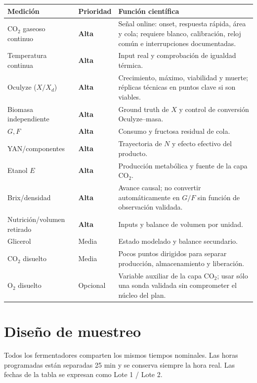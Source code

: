 \documentclass[11pt,a4paper]{article}
\newcommand{\alta}{\textbf{Alta}}
\newcommand{\media}{Media}
\newcommand{\opcional}{Opcional}
\begin{document}
\begin{longtable}{@{}p{}p{}p{}@{}}
\toprule
Medición & Prioridad & Función científica\\
\midrule
\endhead
CO$_2$ gaseoso continuo & \alta & Señal online: onset, respuesta rápida, área y
cola; requiere blanco, calibración, reloj común e interrupciones documentadas.\\
Temperatura continua & \alta & Input real y comprobación de igualdad térmica.\\
Oculyze (\(X/X_d\)) & \alta & Crecimiento, máximo, viabilidad y muerte; réplicas
técnicas en puntos clave si son viables.\\
Biomasa independiente & \alta & Ground truth de \(X\) y control de conversión
Oculyze--masa.\\
\(G,F\) & \alta & Consumo y fructosa residual de cola.\\
YAN/componentes & \alta & Trayectoria de \(N\) y efecto efectivo del producto.\\
Etanol \(E\) & \alta & Producción metabólica y fuente de la capa CO$_2$.\\
Brix/densidad & \alta & Avance causal; no convertir automáticamente en \(G/F\)
sin función de observación validada.\\
Nutrición/volumen retirado & \alta & Inputs y balance de volumen por unidad.\\
Glicerol & \media & Estado modelado y balance secundario.\\
CO$_2$ disuelto & \media & Pocos puntos dirigidos para separar producción,
almacenamiento y liberación.\\
O$_2$ disuelto & \opcional & Variable auxiliar de la capa CO$_2$; usar sólo una
sonda validada sin comprometer el núcleo del plan.\\
\bottomrule
\end{longtable}

\section{Diseño de muestreo}

Todos los fermentadores comparten los mismos tiempos nominales. Las horas
programadas están separadas 25 min y se conserva siempre la hora real. Las
fechas de la tabla se expresan como Lote 1 / Lote 2.
\end{document}
